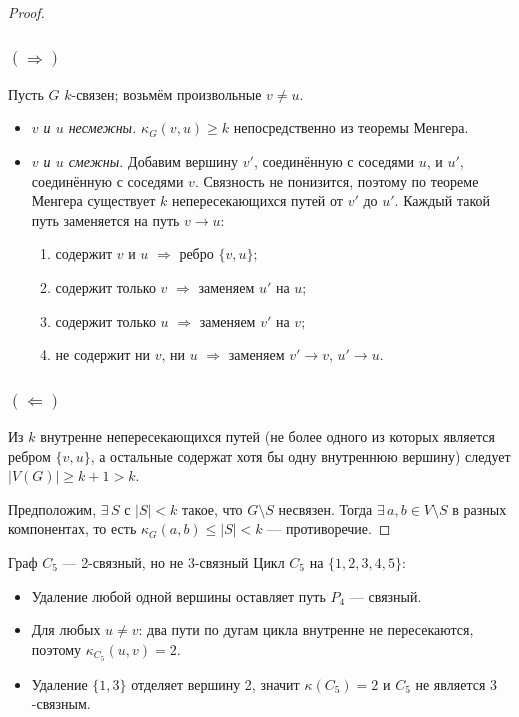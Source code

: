 \begin{proof}
  \subsubsection*{$(\Rightarrow)$}

  Пусть $G$ $k$-связен; возьмём произвольные $v \neq u$.

  \begin{itemize}
    \item \textit{$v$ и $u$ несмежны.}
          $\kappa_G(v,u) \geq k$ непосредственно из теоремы Менгера.

    \item \textit{$v$ и $u$ смежны.}
          Добавим вершину $v'$, соединённую с соседями $u$,
          и $u'$, соединённую с соседями $v$.
          Связность не понизится, поэтому по теореме Менгера
          существует $k$ непересекающихся путей от $v'$ до $u'$.
          Каждый такой путь заменяется на путь $v\!\to\!u$:
          \begin{enumerate}
            \item содержит $v$ и $u$ $\Rightarrow$ ребро $\{v,u\}$;
            \item содержит только $v$ $\Rightarrow$ заменяем $u'$ на $u$;
            \item содержит только $u$ $\Rightarrow$ заменяем $v'$ на $v$;
            \item не содержит ни $v$, ни $u$ $\Rightarrow$ заменяем $v'\!\to\!v$, $u'\!\to\!u$.
          \end{enumerate}
  \end{itemize}

  \subsubsection*{$(\Leftarrow)$}

  Из $k$ внутренне непересекающихся путей (не более одного из которых
  является ребром $\{v,u\}$, а остальные содержат хотя бы одну
  внутреннюю вершину) следует $|V(G)| \geq k+1 > k$.

  Предположим, $\exists\, S$ с $|S| < k$ такое, что $G\setminus S$ несвязен.
  Тогда $\exists\, a,b \in V\setminus S$ в разных компонентах,
  то есть $\kappa_G(a,b) \leq |S| < k$ — противоречие.
\end{proof}

\begin{Example}{Граф $C_5$ — 2-связный, но не 3-связный}{}
  Цикл $C_5$ на $\{1,2,3,4,5\}$:
  \begin{itemize}
    \item Удаление любой одной вершины оставляет путь $P_4$ — связный.
    \item Для любых $u\neq v$: два пути по дугам цикла внутренне не пересекаются,
          поэтому $\kappa_{C_5}(u,v)=2$.
    \item Удаление $\{1,3\}$ отделяет вершину 2, значит $\kappa(C_5)=2$
          и $C_5$ не является $3$-связным.
  \end{itemize}
\end{Example}

